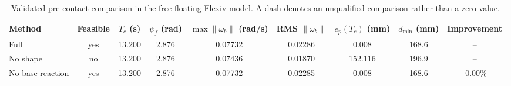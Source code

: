 \begin{table}[t]
\centering
\caption{Validated pre-contact comparison in the free-floating Flexiv model. A dash denotes an unqualified comparison rather than a zero value.}
\label{tab:precontact_comparison}
\begin{tabular}{lcccccccc}
\toprule
Method & Feasible & $T_c$ (s) & $\psi_f$ (rad) & $\max\|\omega_b\|$ (rad/s) & RMS $\|\omega_b\|$ & $e_p(T_c)$ (mm) & $d_{\min}$ (mm) & Improvement \\
\midrule
Full & yes & 13.200 & 2.876 & 0.07732 & 0.02286 & 0.008 & 168.6 & -- \\
No shape & no & 13.200 & 2.876 & 0.07436 & 0.01870 & 152.116 & 196.9 & -- \\
No base reaction & yes & 13.200 & 2.876 & 0.07732 & 0.02285 & 0.008 & 168.6 & -0.00\% \\
\bottomrule
\end{tabular}
\end{table}
